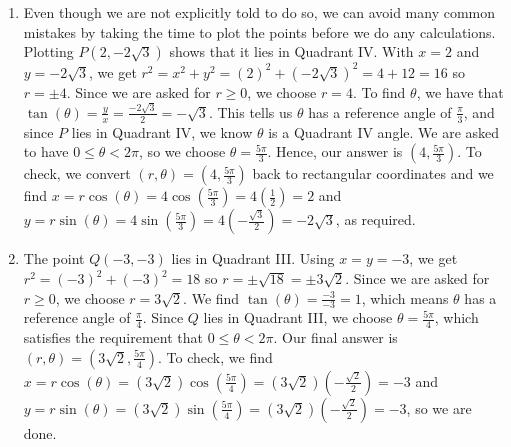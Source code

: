 {
\begin{enumerate}

\item  Even though we are not explicitly told to do so, we can avoid many common mistakes by taking the time to plot the points before we do any calculations.  Plotting $P\left(2,-2\sqrt{3}\right)$ shows that it lies in Quadrant IV.  With $x = 2$ and $y = -2\sqrt{3}$, we get $r^2 = x^2 + y^2 = (2)^2 + \left(-2\sqrt{3}\right)^2 = 4+12 = 16$ so $r = \pm 4$.  Since we are asked for $r \geq 0$, we choose $r = 4$.  To find $\theta$, we have that $\tan(\theta) = \frac{y}{x} = \frac{-2\sqrt{3}}{2} = -\sqrt{3}$.  This tells us $\theta$ has a reference angle of $\frac{\pi}{3}$, and  since $P$ lies in Quadrant IV, we know $\theta$ is a Quadrant IV angle.   We are asked to have $0 \leq \theta < 2\pi$, so we choose $\theta = \frac{5\pi}{3}$.  Hence, our answer is  $\left(4, \frac{5\pi}{3}\right)$.  To check, we convert $(r,\theta) = \left(4, \frac{5\pi}{3}\right)$ back to rectangular coordinates and we find $x = r \cos(\theta) = 4 \cos\left(\frac{5\pi}{3}\right) = 4 \left(\frac{1}{2}\right) =  2$ and  $y = r \sin(\theta) = 4 \sin\left(\frac{5\pi}{3}\right) = 4 \left(-\frac{\sqrt{3}}{2}\right) = -2\sqrt{3}$, as required.



\item  The point $Q(-3,-3)$ lies in Quadrant III.  Using $x = y = -3$, we get  $r^2 = (-3)^2 + (-3)^2 = 18$ so $r = \pm \sqrt{18} = \pm 3\sqrt{2}$.  Since we are asked for $r \geq 0$, we choose $r = 3 \sqrt{2}$.  We find $\tan(\theta) = \frac{-3}{-3} = 1$, which means $\theta$ has a reference angle of $\frac{\pi}{4}$.  Since $Q$ lies in Quadrant III, we choose $\theta = \frac{5\pi}{4}$, which satisfies the requirement that $0 \leq \theta < 2\pi$.  Our final answer is  $(r,\theta) = \left(3\sqrt{2}, \frac{5\pi}{4}\right)$.  To check, we find $x = r\cos(\theta) = (3\sqrt{2}) \cos\left(\frac{5\pi}{4}\right) = (3\sqrt{2})\left(-\frac{\sqrt{2}}{2}\right) = -3$ and $y = r\sin(\theta) = (3\sqrt{2}) \sin\left(\frac{5\pi}{4}\right) = (3\sqrt{2})\left(-\frac{\sqrt{2}}{2}\right) = -3$, so we are done.



\end{enumerate}}
